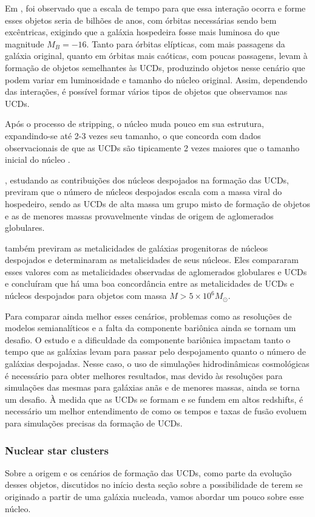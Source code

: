 Em \cite{Bekki_2003}, foi observado que a escala de tempo para que essa interação ocorra e forme esses objetos seria de bilhões de anos, com órbitas necessárias sendo bem excêntricas, exigindo que a galáxia hospedeira fosse mais luminosa do que magnitude $M_B = -16$. Tanto para órbitas elípticas, com mais passagens da galáxia original, quanto em órbitas mais caóticas, com poucas passagens, levam à formação de objetos semelhantes às UCDs, produzindo objetos nesse cenário que podem variar em luminosidade e tamanho do núcleo original. Assim, dependendo das interações, é possível formar vários tipos de objetos que observamos nas UCDs.

Após o processo de stripping, o núcleo muda pouco em sua estrutura, expandindo-se até 2-3 vezes seu tamanho, o que concorda com dados observacionais de que as UCDs são tipicamente 2 vezes maiores que o tamanho inicial do núcleo \citep{Evstigneeva_2008}.

\cite{Pfeffer_2016}, estudando as contribuições dos núcleos despojados na formação das UCDs, previram que o número de núcleos despojados escala com a massa viral do hospedeiro, sendo as UCDs de alta massa um grupo misto de formação de objetos e as de menores massas provavelmente vindas de origem de aglomerados globulares.

\cite{Pfeffer_2016} também previram as metalicidades de galáxias progenitoras de núcleos despojados e determinaram as metalicidades de seus núcleos. Eles compararam esses valores com as metalicidades observadas de aglomerados globulares e UCDs e concluíram que há uma boa concordância entre as metalicidades de UCDs e núcleos despojados para objetos com massa $M > 5 \times 10^6 M_{\odot}$.

Para comparar ainda melhor esses cenários, problemas como as resoluções de modelos semianalíticos e a falta da componente bariônica ainda se tornam um desafio. O estudo e a dificuldade da componente bariônica impactam tanto o tempo que as galáxias levam para passar pelo despojamento quanto o número de galáxias despojadas. Nesse caso, o uso de simulações hidrodinâmicas cosmológicas é necessário para obter melhores resultados, mas devido às resoluções para simulações das mesmas para galáxias anãs e de menores massas, ainda se torna um desafio. À medida que as UCDs se formam e se fundem em altos redshifts, é necessário um melhor entendimento de como os tempos e taxas de fusão evoluem para simulações precisas da formação de UCDs.

\subsubsection{Nuclear star clusters}\label{subsubsection:NSC}
Sobre a origem e os cenários de formação das UCDs, como parte da evolução desses objetos, discutidos no início desta seção sobre a possibilidade de terem se originado a partir de uma galáxia nucleada, vamos abordar um pouco sobre esse núcleo.

